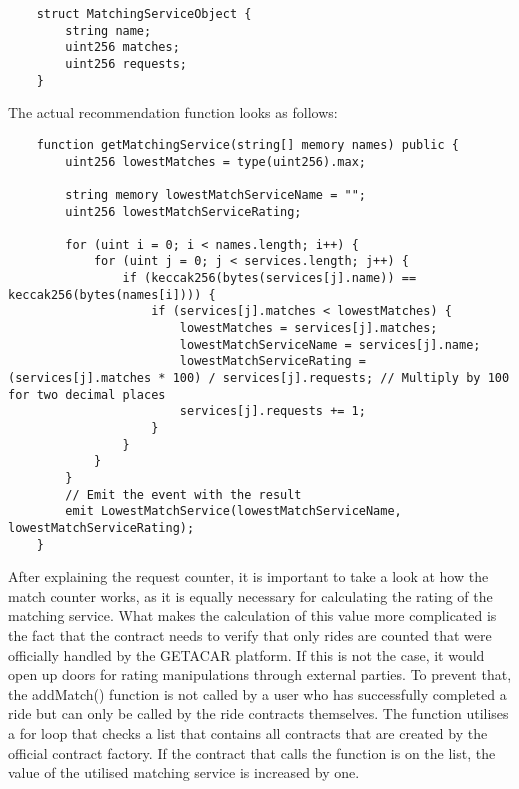 \lstset{
  basicstyle=\footnotesize\ttfamily,
  breaklines=true,
  numbers=left,
  firstnumber=6
}
\begin{lstlisting}
    struct MatchingServiceObject {
        string name;
        uint256 matches;
        uint256 requests;
    }
\end{lstlisting}

The actual recommendation function looks as follows: 

\lstset{
  basicstyle=\footnotesize\ttfamily,
  breaklines=true,
  numbers=left,
  firstnumber=59
}
\begin{lstlisting}
    function getMatchingService(string[] memory names) public {
        uint256 lowestMatches = type(uint256).max;

        string memory lowestMatchServiceName = "";
        uint256 lowestMatchServiceRating;

        for (uint i = 0; i < names.length; i++) {
            for (uint j = 0; j < services.length; j++) {
                if (keccak256(bytes(services[j].name)) == keccak256(bytes(names[i]))) {
                    if (services[j].matches < lowestMatches) {
                        lowestMatches = services[j].matches;
                        lowestMatchServiceName = services[j].name;
                        lowestMatchServiceRating = (services[j].matches * 100) / services[j].requests; // Multiply by 100 for two decimal places
                        services[j].requests += 1;
                    }
                }
            }
        }
        // Emit the event with the result
        emit LowestMatchService(lowestMatchServiceName, lowestMatchServiceRating);
    }
\end{lstlisting}


After explaining the request counter, it is important to take a look at how the match counter works, as it is equally necessary for calculating the rating of the matching service. What makes the calculation of this value more complicated is the fact that the contract needs to verify that only rides are counted that were officially handled by the GETACAR platform. If this is not the case, it would open up doors for rating manipulations through external parties. To prevent that, the addMatch() function is not called by a user who has successfully completed a ride but can only be called by the ride contracts themselves. The function utilises a for loop that checks a list that contains all contracts that are created by the official contract factory. If the contract that calls the function is on the list, the value of the utilised matching service is increased by one.

